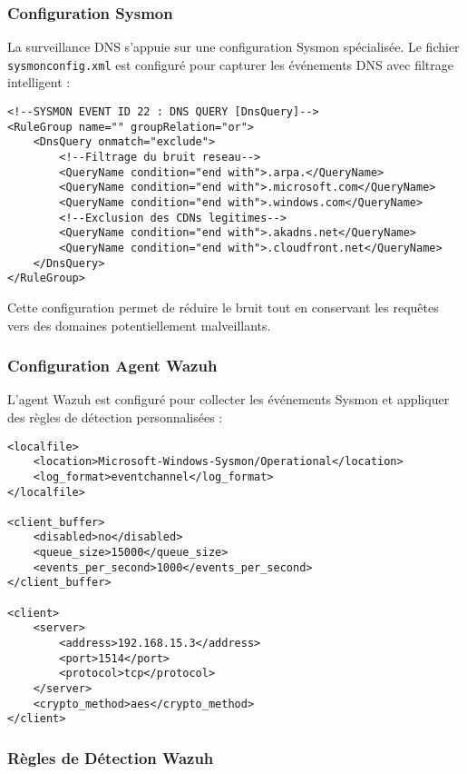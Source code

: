 \subsubsection{Configuration Sysmon}

La surveillance DNS s'appuie sur une configuration Sysmon spécialisée. Le fichier \texttt{sysmonconfig.xml} est configuré pour capturer les événements DNS avec filtrage intelligent :
\newpage
\begin{lstlisting}[style=XMLStyle, caption=Configuration Sysmon pour DNS, label=lst:sysmon-dns]
<!--SYSMON EVENT ID 22 : DNS QUERY [DnsQuery]-->
<RuleGroup name="" groupRelation="or">
    <DnsQuery onmatch="exclude">
        <!--Filtrage du bruit reseau-->
        <QueryName condition="end with">.arpa.</QueryName>
        <QueryName condition="end with">.microsoft.com</QueryName>
        <QueryName condition="end with">.windows.com</QueryName>
        <!--Exclusion des CDNs legitimes-->
        <QueryName condition="end with">.akadns.net</QueryName>
        <QueryName condition="end with">.cloudfront.net</QueryName>
    </DnsQuery>
</RuleGroup>
\end{lstlisting}

Cette configuration permet de réduire le bruit tout en conservant les requêtes vers des domaines potentiellement malveillants.

\subsubsection{Configuration Agent Wazuh}

L'agent Wazuh est configuré pour collecter les événements Sysmon et appliquer des règles de détection personnalisées :

\begin{lstlisting}[style=XMLStyle, caption=Configuration Agent Wazuh, label=lst:wazuh-agent-dns]
<localfile>
    <location>Microsoft-Windows-Sysmon/Operational</location>
    <log_format>eventchannel</log_format>
</localfile>

<client_buffer>
    <disabled>no</disabled>
    <queue_size>15000</queue_size>
    <events_per_second>1000</events_per_second>
</client_buffer>

<client>
    <server>
        <address>192.168.15.3</address>
        <port>1514</port>
        <protocol>tcp</protocol>
    </server>
    <crypto_method>aes</crypto_method>
</client>
\end{lstlisting}

\subsubsection{Règles de Détection Wazuh}

